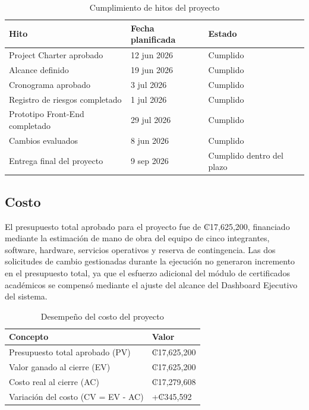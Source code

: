 \documentclass[11pt,spanish]{article}
\begin{document}
\begin{table}[H]
\centering
\caption{Cumplimiento de hitos del proyecto}
\label{tab:hitos}
{\small
\begin{tabularx}{\textwidth}{p{6cm}p{3cm}Y}
\toprule
\textbf{Hito} &
\textbf{Fecha planificada} &
\textbf{Estado} \\
\midrule

Project Charter aprobado &
12 jun 2026 &
Cumplido \\

Alcance definido &
19 jun 2026 &
Cumplido \\

Cronograma aprobado &
3 jul 2026 &
Cumplido \\

Registro de riesgos completado &
1 jul 2026 &
Cumplido \\

Prototipo Front-End completado &
29 jul 2026 &
Cumplido \\

Cambios evaluados &
8 jun 2026 &
Cumplido \\

Entrega final del proyecto &
9 sep 2026 &
Cumplido dentro del plazo \\

\bottomrule
\end{tabularx}
}
\end{table}

\subsection{Costo}

El presupuesto total aprobado para el proyecto fue de ₡17,625,200, financiado mediante la estimación de mano de obra del equipo de cinco integrantes, software, hardware, servicios operativos y reserva de contingencia. Las dos solicitudes de cambio gestionadas durante la ejecución no generaron incremento en el presupuesto total, ya que el esfuerzo adicional del módulo de certificados académicos se compensó mediante el ajuste del alcance del Dashboard Ejecutivo del sistema.

\begin{table}[H]
\centering
\caption{Desempeño del costo del proyecto}
\label{tab:costo-proyecto}
\begin{tabularx}{\textwidth}{p{8cm}Y}
\toprule
\textbf{Concepto} & \textbf{Valor} \\
\midrule
Presupuesto total aprobado (PV) & ₡17,625,200 \\
Valor ganado al cierre (EV) & ₡17,625,200 \\
Costo real al cierre (AC) & ₡17,279,608 \\
Variación del costo (CV = EV - AC) & +₡345,592 \\
\bottomrule
\end{tabularx}
\end{table}
\end{document}
